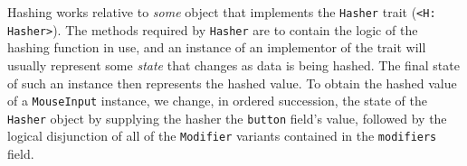 Hashing      works      relative      to     \textit{some}      object      that
implements    the    \texttt{Hasher}   trait    (\texttt{<H:
Hasher>})\cite{therustbook}. The  methods required  by \texttt{Hasher}
are  to contain  the logic  of  the hashing  function  in use,  and an  instance
of  an implementor  of  the  trait will  usually  represent some  \textit{state}
that  changes  as  data  is  being  hashed\cite{therustbook,  rusttrickhashmap}.
The   final   state  of   such   an   instance   then  represents   the   hashed
value\cite{therustbook,  rusttrickhashmap}.  To obtain  the  hashed  value of  a
\texttt{MouseInput} instance,  we change,  in ordered  succession, the
state  of  the \texttt{Hasher}  object  by  supplying the  hasher  the
\texttt{button}  field's value,  followed by  the logical  disjunction
of   all  of   the   \texttt{Modifier}  variants   contained  in   the
\texttt{modifiers} field.

